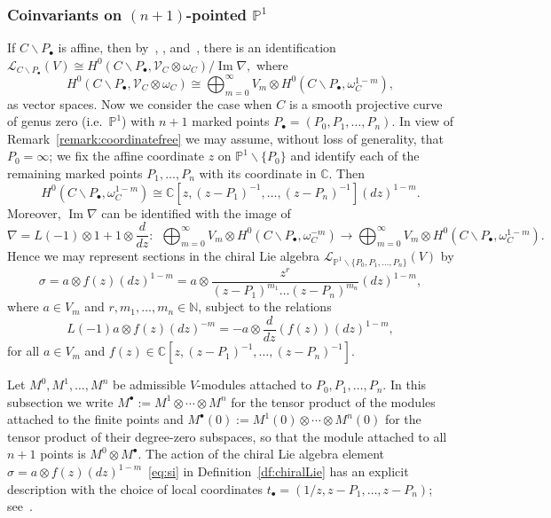 \documentclass[12pt,a4paper,reqno]{amsart}
\numberwithin{equation}{section}
\theoremstyle{definition}
\newcommand{\im}{\operatorname{Im}}
\newcommand{\C}{\mathbb{C}}
\newcommand{\N}{\mathbb{N}}
\renewcommand{\P}{\mathbb{P}}
\def\bs{\backslash}
\def\om{\omega}
\def\o{\otimes}
\def\ra{\rightarrow}
\def\ds{\dots}
\def\si{\sigma}
\begin{document}
\subsubsection{Coinvariants on $(n+1)$-pointed $\P^1$}
		If $C\bs P_\bullet$ is affine, then by~\cite[Section 5.1]{DG}, \cite[Lemma 2.6.1]{DGT2}, and~\cite[Section 5.1]{NT}, there is an identification
	$
	\mathcal{L}_{C\bs P_\bullet}(V)\cong H^0(C\bs P_\bullet, \mathscr{V}_C\o \om_C)/\im\nabla,
	$
	where
	\[
	H^0(C\bs P_\bullet, \mathscr{V}_C\o \om_C)\cong \bigoplus_{m=0}^\infty V_m\o H^0(C\bs P_\bullet, \om_C^{1-m}),
	\]
    as vector spaces.
Now we consider the case when $C$ is a smooth projective curve of genus zero (i.e.\ $\P^1$) with $n+1$ marked points $P_\bullet=(P_0,P_1,\ds,P_n)$. In view of Remark~\ref{remark:coordinatefree} we may assume, without loss of generality, that $P_0=\infty$; we fix the affine coordinate $z$ on $\P^1\bs\{P_0\}$ and identify each of the remaining marked points $P_1,\ds,P_n$ with its coordinate in $\C$. Then
    \[
H^0(C\bs P_\bullet, \om_C^{1-m})\cong \C[z, (z-P_1)^{-1},\ds, (z-P_n)^{-1}] (dz)^{1-m}.
    \]
Moreover, $\im\nabla$ can be identified with the image of \[\nabla=L(-1)\o 1+1\o \frac{d}{dz}:\ \ \bigoplus_{m=0}^\infty V_m\o H^0(C\bs P_\bullet,\om_C^{-m})\ra \bigoplus_{m=0}^\infty V_m\o H^0(C\bs P_\bullet, \om_C^{1-m}). \]
Hence we may represent sections in the chiral Lie algebra $ \mathcal{L}_{\P^1\bs \{P_0,P_1,\ds ,P_n\}}(V)$ by
\begin{equation}\label{eq:si}
    \si=a\o f(z) (dz)^{1-m}=	a\o \frac{z^r}{(z-P_1)^{m_1}\ds (z-P_n)^{m_n}} (dz)^{1-m},
\end{equation}
where $ a\in V_m$ and $r,m_1,\ds,m_n\in \N$,
subject to the relations
\[L(-1)a\o f(z) (dz)^{-m}=-a\o \frac{d}{dz}(f(z)) (dz)^{1-m},\]
for all $a\in V_m$ and $f(z)\in \C[z, (z-P_1)^{-1},\ds, (z-P_n)^{-1}]$.

Let $M^0,M^1,\ds, M^n$ be admissible $V$-modules attached to $P_0,P_1,\ds,P_n$. In this subsection we write $M^\bullet:=M^1\o\cdots\o M^n$ for the tensor product of the modules attached to the finite points and $M^\bullet(0):=M^1(0)\o\cdots\o M^n(0)$ for the tensor product of their degree-zero subspaces, so that the module attached to all $n+1$ points is $M^0\o M^\bullet$. The action of the chiral Lie algebra element $\si=a \o  f(z) (dz)^{1-m}$~\eqref{eq:si} in Definition~\ref{df:chiralLie} has an explicit description with the choice of local coordinates $t_\bullet=(1/z,z-P_1,\ds ,z-P_n)$; see~\cite[Definition 5.1.2]{NT}.
\end{document}
